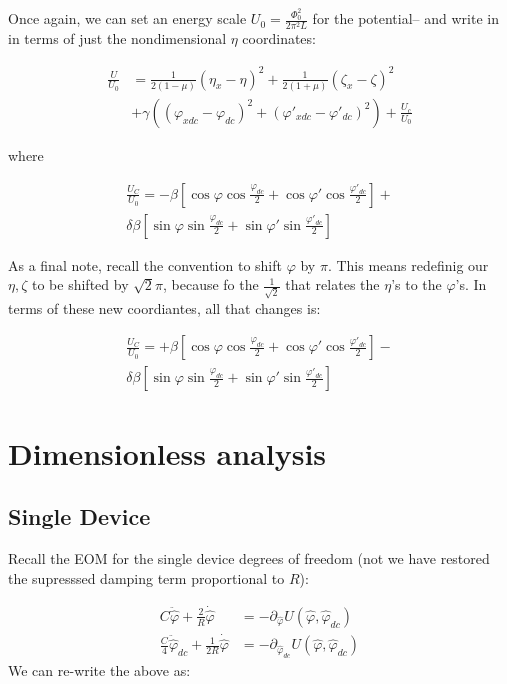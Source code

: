 \documentclass[paper=a4, twocolumn, fontsize=10pt]{article} %
\numberwithin{equation}{section} %
\numberwithin{figure}{section} %
\numberwithin{table}{section} %
\def \df#1{\hat{#1}}
\def \dl#1{#1}
\begin{document}
Once again, we can set an energy scale $U_0 = \frac{\Phi_0^2}{2\pi^2L}$ for the potential-- and write in in terms of just the nondimensional $\dl\eta$ coordinates:


\begin{align*}
\frac{U}{U_0} &= \frac{1}{2(1-\mu)} (\dl\eta_x-\dl\eta)^2 + \frac{1}{2(1+\mu)} (\dl\zeta_x-\dl\zeta)^2 \\
 &+ \gamma \left( (\dl\varphi_{xdc}-\dl\varphi_{dc})^2 + (\dl\varphi'_{xdc}-\dl\varphi'_{dc})^2\right) + \frac{U_c}{U_0}
\end{align*}

where

\begin{multline}
    \frac{U_C}{U_0} = -\beta \left[ \cos\dl\varphi\cos\frac{\dl\varphi_{dc}}{2} + \cos\dl\varphi'\cos\frac{\dl\varphi'_{dc}}{2} \right] + \\
    \delta\beta \left[ \sin\dl\varphi\sin\frac{\dl\varphi_{dc}}{2} + \sin\dl\varphi'\sin\frac{\dl\varphi'_{dc}}{2} \right]
\end{multline}

As a final note, recall the convention to shift $\dl\varphi$ by $\pi$. This means redefinig our $\dl\eta,\dl\zeta$ to be shifted by $\sqrt{2}\pi$, because fo the $\frac{1}{\sqrt2}$ that relates the $\dl\eta$'s to the $\dl\varphi$'s. In terms of these new coordiantes, all that changes is:

\begin{multline}
    \frac{U_C}{U_0} = +\beta \left[ \cos\dl\varphi\cos\frac{\dl\varphi_{dc}}{2} + \cos\dl\varphi'\cos\frac{\dl\varphi'_{dc}}{2} \right] - \\
    \delta\beta \left[ \sin\dl\varphi\sin\frac{\dl\varphi_{dc}}{2} + \sin\dl\varphi'\sin\frac{\dl\varphi'_{dc}}{2} \right]
\end{multline}



\section{Dimensionless analysis}

\subsection{Single Device}

Recall the EOM for the single device degrees of freedom (not we have restored the supresssed damping term proportional to $R$):

\begin{align}
    C \ddot{\df\varphi} + \frac{2}{R} \dot{\df\varphi} &= - \partial_{\df\varphi} U(\df\varphi, \df\varphi_{dc})
    \\
    \frac{C}{4} \ddot{\df\varphi}_{dc} + \frac{1}{2R} \dot{\df\varphi} &= - \partial_{\df\varphi_{dc}} U(\df\varphi, \df\varphi_{dc})
    \end{align}
We can re-write the above as:
\end{document}

